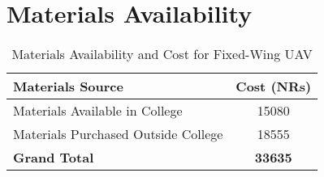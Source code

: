 \section*{Materials Availability}
\begin{table}[h]
\centering
\begin{tabular}{l S[table-format=5.0]}
\toprule
\textbf{Materials Source} & \textbf{Cost (NRs)} \\
\midrule
Materials Available in College & 15080 \\
Materials Purchased Outside College & 18555 \\
\midrule
\textbf{Grand Total} & \textbf{33635} \\
\bottomrule
\end{tabular}
\caption{Materials Availability and Cost for Fixed-Wing UAV}
\end{table}

